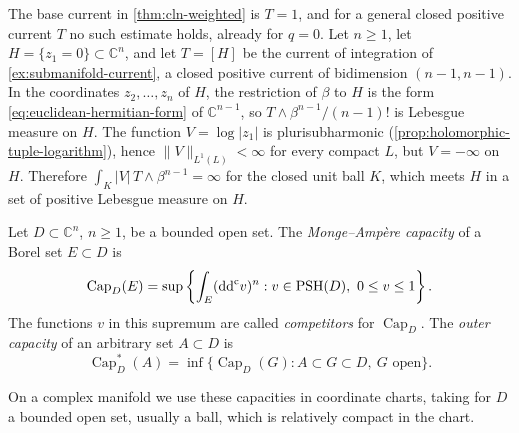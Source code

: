 
The base current in \cref{thm:cln-weighted} is $T=1$, and for a general closed positive current $T$ no such estimate holds, already for $q=0$. Let $n\ge1$, let $H=\{z_1=0\}\subset\mathbb C^n$, and let $T=[H]$ be the current of integration of \cref{ex:submanifold-current}, a closed positive current of bidimension $(n-1,n-1)$. In the coordinates $z_2,\ldots,z_n$ of $H$, the restriction of $\beta$ to $H$ is the form \eqref{eq:euclidean-hermitian-form} of $\mathbb C^{n-1}$, so $T\wedge\beta^{n-1}/(n-1)!$ is Lebesgue measure on $H$. The function $V=\log|z_1|$ is plurisubharmonic (\cref{prop:holomorphic-tuple-logarithm}), hence $\|V\|_{L^1(L)}<\infty$ for every compact $L$, but $V=-\infty$ on $H$. Therefore $\int_K|V|\,T\wedge\beta^{n-1}=\infty$ for the closed unit ball $K$, which meets $H$ in a set of positive Lebesgue measure on $H$.

\begin{definition}\label{def:monge-ampere-capacity}
Let $D\subset\mathbb{C}^n$, $n\ge1$, be a bounded open set. The \emph{Monge--Amp\`ere capacity} of a Borel set $E\subset D$ is
\[
 \operatorname{Cap}_D(E)=\sup\left\{\int_E(\mathrm{dd}^{\mathrm{c}} v)^n:
            v\in\mathrm{PSH}(D),\ 0\le v\le1\right\}.
\]
The functions $v$ in this supremum are called \emph{competitors} for $\operatorname{Cap}_D$. The \emph{outer capacity} of an arbitrary set $A\subset D$ is
\[
 \operatorname{Cap}_D^*(A)=\inf\{\operatorname{Cap}_D(G):A\subset G\subset D,
                                                  \ G\text{ open}\}.
\]
\end{definition}
On a complex manifold we use these capacities in coordinate charts, taking for $D$ a bounded open set, usually a ball, which is relatively compact in the chart.

